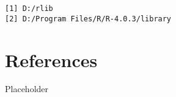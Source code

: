 \documentclass[twoside,12pt,final]{ucthesis-CA2012}
\begin{document}
\begin{ucmainmatter}
\begin{verbatim}
[1] D:/rlib
[2] D:/Program Files/R/R-4.0.3/library
\end{verbatim}
\hypertarget{references}{%
\chapter*{References}\label{references}}

Placeholder

\end{ucmainmatter}
\end{document}
